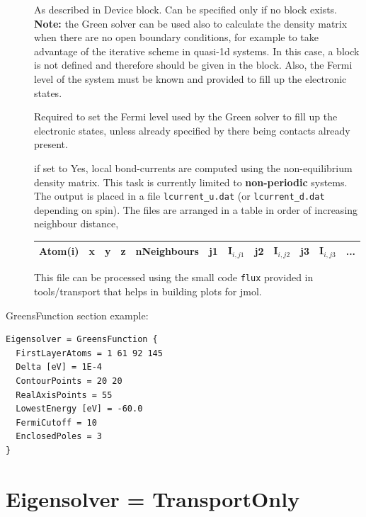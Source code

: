 \begin{description}
\item[] As described in Device block. Can be specified only
  if no  block exists.  {\bf Note:} the Green solver can be used
  also to calculate the density matrix when there are no open boundary
  conditions, for example to take advantage of the iterative scheme in quasi-1d
  systems. In this case, a  block is not defined and therefore
   should be given in the  block. Also,
  the Fermi level of the system must be known and provided to fill up the
  electronic states.

\item[] Required to set the Fermi level
  used by the Green solver to fill up the electronic states, unless already
  specified by there being contacts already present.

\item[] if set to Yes, local bond-currents are computed using
  the non-equilibrium density matrix.  This task is currently limited to
  \textbf{non-periodic} systems. The output is placed in a file
  \verb|lcurrent_u.dat| (or \verb|lcurrent_d.dat| depending on spin).  The files
  are arranged in a table in order of increasing neighbour distance,

\begin{tabular}{|c|c|c|c|c|c|c|c|c|c|c|c|}
  \hline
  Atom(i) & x & y & z &  nNeighbours &  j1 & I$_{i,j1}$ & j2 & I$_{i,j2}$ &  j3 & I$_{i,j3}$ & ...\\
  \hline
\end{tabular}

  This file can be processed using the small code \verb|flux| provided in
  tools/transport that helps in building plots for jmol.
\end{description}

GreensFunction section example:

\begin{verbatim}
Eigensolver = GreensFunction {
  FirstLayerAtoms = 1 61 92 145
  Delta [eV] = 1E-4
  ContourPoints = 20 20
  RealAxisPoints = 55
  LowestEnergy [eV] = -60.0
  FermiCutoff = 10
  EnclosedPoles = 3
}
\end{verbatim}


\section{Eigensolver = TransportOnly}


